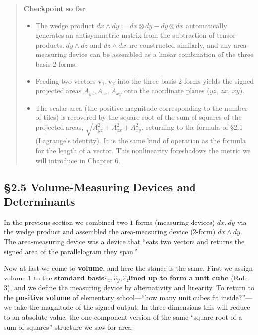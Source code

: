 \documentclass[a4paper,12pt,openany]{book}
\begin{document}
\begin{quote}
\textbf{Checkpoint so far}

\begin{itemize}
\item
  The wedge product \(dx \wedge dy := dx \otimes dy - dy \otimes dx\)
  automatically generates an antisymmetric matrix from the subtraction
  of tensor products. \(dy \wedge dz\) and \(dz \wedge dx\) are
  constructed similarly, and any area-measuring device can be assembled
  as a linear combination of the three basis \(2\)-forms.
\item
  Feeding two vectors \(\mathbf{v}_1,\mathbf{v}_2\) into the three basis
  \(2\)-forms yields the signed projected areas \(A_{yz},A_{zx},A_{xy}\)
  onto the coordinate planes (\(yz\), \(zx\), \(xy\)).
\item
  The scalar area (the positive magnitude corresponding to the number of
  tiles) is recovered by the square root of the sum of squares of the
  projected areas, \(\sqrt{A_{yz}^2 + A_{zx}^2 + A_{xy}^2}\), returning
  to the formula of §2.1 (Lagrange's identity). It is the same kind of
  operation as the formula for the length of a vector. This nonlinearity
  foreshadows the metric we will introduce in Chapter 6.
\end{itemize}
\end{quote}

\par\vspace{0.35em}\par

\hypertarget{volume-measuring-devices-and-determinants}{%
\subsection{§2.5 Volume-Measuring Devices and
Determinants}\label{volume-measuring-devices-and-determinants}}

In the previous section we combined two \(1\)-forms (measuring devices)
\(dx, dy\) via the wedge product and assembled the area-measuring device
(\(2\)-form) \(dx \wedge dy\). The area-measuring device was a device
that ``eats two vectors and returns the signed area of the parallelogram
they span.''

Now at last we come to \textbf{volume}, and here the stance is the same.
First we assign volume \(1\) to the
\textbf{standard basis}\(\hat{e}_x,\hat{e}_y,\hat{e}_z\)\textbf{lined up to form a unit cube}
(Rule 3), and we define the measuring device by alternativity and
linearity. To return to the \textbf{positive volume} of elementary
school—``how many unit cubes fit inside?''—we take the magnitude of
the signed output. In three dimensions this will reduce to an absolute
value, the one-component version of the same ``square root of a sum of
squares'' structure we saw for area.
\end{document}
